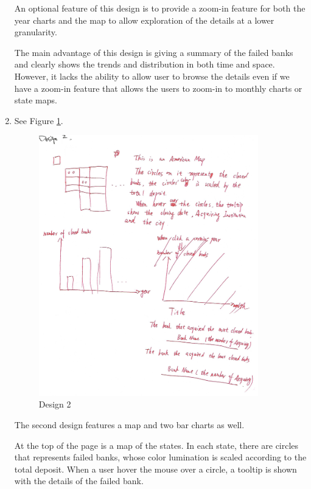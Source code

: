 \documentclass[11pt]{article}
\begin{document}
\begin{enumerate}
        An optional feature of this design is to provide a zoom-in feature for
        both the year charts and the map to allow exploration of the details
        at a lower granularity.

        The main advantage of this design is giving a summary of the failed
        banks and clearly shows the trends and distribution in both time and
        space. However, it lacks the ability to allow user to browse the
        details even if we have a zoom-in feature that allows the users to
        zoom-in to monthly charts or state maps.

    \item See Figure \ref{fig:design_2}.

        \begin{figure}[!h]
            \centering
            \includegraphics[width=0.9\textwidth]{fig/design_2}
            \caption{Design 2}
            \label{fig:design_2}
        \end{figure}

        The second design features a map and two bar charts as well.

        At the top of the page is a map of the states. In each state, there
        are circles that represents failed banks, whose color lumination is
        scaled according to the total deposit. When a user hover the mouse
        over a circle, a tooltip is shown with the details of the failed bank.


\end{enumerate}
\end{document}
